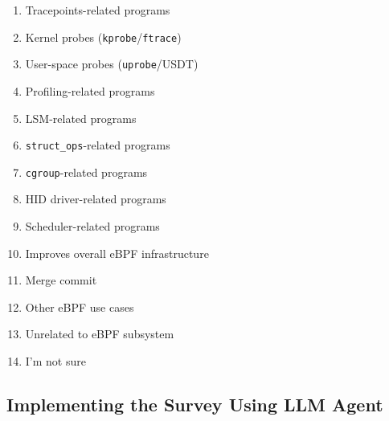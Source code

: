 \begin{enumerate}
\begin{enumerate}[label=(\alph*)]
        \item Tracepoints-related programs
        \item Kernel probes (\texttt{kprobe}/\texttt{ftrace})
        \item User-space probes (\texttt{uprobe}/USDT)
        \item Profiling-related programs
        \item LSM-related programs
        \item \texttt{struct\_ops}-related programs
        \item \texttt{cgroup}-related programs
        \item HID driver-related programs
        \item Scheduler-related programs
        \item Improves overall eBPF infrastructure
        \item Merge commit
        \item Other eBPF use cases
        \item Unrelated to eBPF subsystem
        \item I'm not sure
    \end{enumerate}
\end{enumerate}





\subsection{Implementing the Survey Using LLM Agent}

